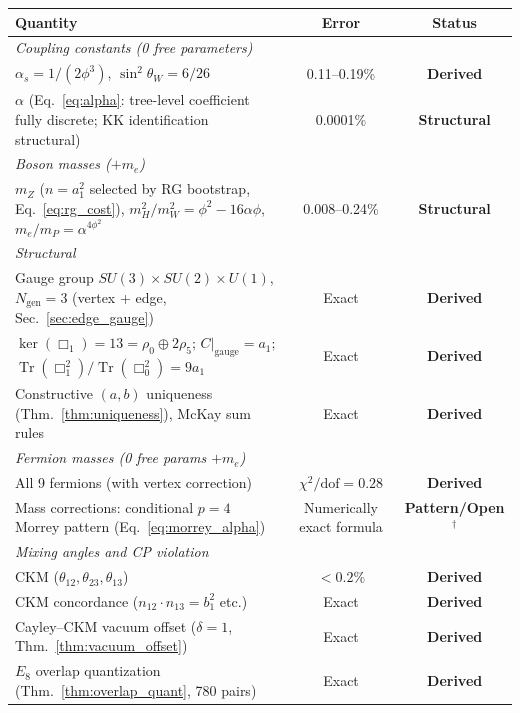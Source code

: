 \documentclass[12pt,a4paper]{article}
\theoremstyle{definition}
\begin{document}
\begin{table}[H]
\centering\footnotesize
\begin{tabular}{lcc}
\toprule
\textbf{Quantity} & \textbf{Error} & \textbf{Status} \\
\midrule
\multicolumn{3}{l}{\textit{Coupling constants (0 free parameters)}} \\
$\alpha_s = 1/(2\phi^3)$, $\sin^2\theta_W = 6/26$ & 0.11--0.19\% & \textbf{Derived} \\
$\alpha$ (Eq.~\ref{eq:alpha}: tree-level coefficient fully discrete; KK identification structural) & 0.0001\% & \textbf{Structural} \\
\midrule
\multicolumn{3}{l}{\textit{Boson masses ($+m_e$)}} \\
$m_Z$ ($n\!=\!a_1^2$ selected by RG bootstrap, Eq.~\ref{eq:rg_cost}), $m_H^2/m_W^2 = \phi^2 - 16\alpha\phi$, $m_e/m_P = \alpha^{4\phi^2}$ & 0.008--0.24\% & \textbf{Structural} \\
\midrule
\multicolumn{3}{l}{\textit{Structural}} \\
Gauge group $SU(3) \times SU(2) \times U(1)$, $N_{\text{gen}} = 3$ (vertex + edge, Sec.~\ref{sec:edge_gauge}) & Exact & \textbf{Derived} \\
$\ker(\Box_1) = 13 = \rho_0 \oplus 2\rho_5$; $C|_{\text{gauge}} = a_1$; $\operatorname{Tr}(\Box_1^2)/\operatorname{Tr}(\Box_0^2) = 9a_1$ & Exact & \textbf{Derived} \\
Constructive $(a,b)$ uniqueness (Thm.~\ref{thm:uniqueness}), McKay sum rules & Exact & \textbf{Derived} \\
\midrule
\multicolumn{3}{l}{\textit{Fermion masses (0 free params $+ m_e$)}} \\
All 9 fermions (with vertex correction) & $\chi^2/\text{dof} = 0.28$ & \textbf{Derived} \\
Mass corrections: conditional $p=4$ Morrey pattern (Eq.~\ref{eq:morrey_alpha}) & Numerically exact formula & \textbf{Pattern/Open}$^\dagger$ \\
\midrule
\multicolumn{3}{l}{\textit{Mixing angles and CP violation}} \\
CKM ($\theta_{12}, \theta_{23}, \theta_{13}$) & $<0.2\%$ & \textbf{Derived} \\
CKM concordance ($n_{12}\!\cdot\! n_{13} = b_1^2$ etc.) & Exact & \textbf{Derived} \\
Cayley--CKM vacuum offset ($\delta = 1$, Thm.~\ref{thm:vacuum_offset}) & Exact & \textbf{Derived} \\
$E_8$ overlap quantization (Thm.~\ref{thm:overlap_quant}, 780 pairs) & Exact & \textbf{Derived} \\

\end{tabular}
\end{table}
\end{document}
